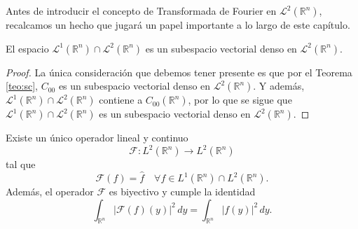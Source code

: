\vspace{0.2cm}
\noindent Antes de introducir el concepto de Transformada de Fourier en $\mathscr{L}^2(\mathbb{R}^n)$, recalcamos un hecho que jugará un papel importante a lo largo de este capítulo.
\begin{proposicion}\label{propo}
    El espacio $\mathscr{L}^1(\mathbb{R}^n) \cap \mathscr{L}^2(\mathbb{R}^n)$ es un subespacio vectorial denso en $\mathscr{L}^2(\mathbb{R}^n)$.
\end{proposicion}
\begin{proof}
   La única consideración que debemos tener presente es que  por el Teorema \ref{teo:sc}, $C_{00}$ es un subespacio vectorial denso en $\mathscr{L}^2(\mathbb{R}^n)$. Y además,  $\mathscr{L}^1(\mathbb{R}^n) \cap \mathscr{L}^2(\mathbb{R}^n)$ contiene a $C_{00}(\mathbb{R}^n)$, por lo que se sigue que $\mathscr{L}^1(\mathbb{R}^n) \cap \mathscr{L}^2(\mathbb{R}^n)$ es un subespacio vectorial denso en $\mathscr{L}^2(\mathbb{R}^n)$.
\end{proof}


\begin{teorema}[Plancharel]\label{teoplan}
Existe un único operador lineal y continuo
\begin{equation}
    \mathscr{F} : L^2(\mathbb{R}^n) \rightarrow L^2(\mathbb{R}^n)
\end{equation}
tal que 
\begin{equation}\label{ecuacionop}
    \mathscr{F}(f) = \widehat{f} \quad \forall f \in L^1(\mathbb{R}^n) \cap L^2(\mathbb{R}^n).
\end{equation}
Además, el operador $\mathscr{F}$ es biyectivo y cumple la identidad
\begin{equation}
    \int_{\mathbb{R}^n} |\mathscr{F}(f)(y)|^2   \, dy = \int_{\mathbb{R}^n} |f(y)|^2 \, dy.
\end{equation}
\end{teorema}

